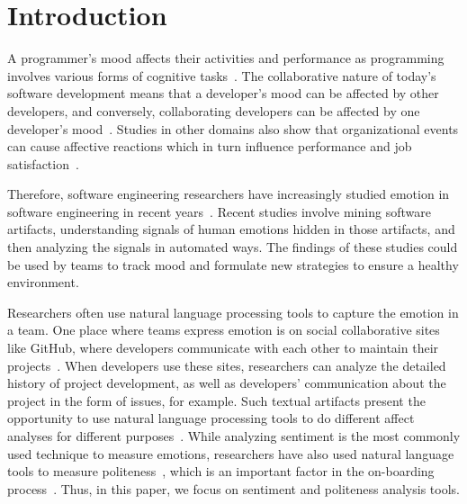 \section{Introduction}

A programmer's mood affects their activities and performance as programming involves various forms of cognitive tasks~\cite{khan2011moods}. 
The collaborative nature of today's software development
means that a developer's mood can be affected by other
developers, and conversely, collaborating developers can be 
affected by one developer's 
mood~\cite{murgia2014developers,graziotin2014happy,curtis1988field}. 
Studies in other domains also show that organizational events can cause affective reactions which in turn influence performance and job satisfaction~\cite{parkinson1996changing}. 

Therefore, software engineering researchers have increasingly studied emotion in software engineering in recent years~\cite{jongeling2017negative}. 
Recent studies involve 
mining software artifacts, 
understanding signals of human emotions hidden in those artifacts, and 
then analyzing the signals in automated ways. 
The findings of these studies could be used by teams to 
track mood and formulate new strategies to ensure 
a healthy environment.


Researchers often use natural language processing tools to capture the emotion in a team.
One place where teams express emotion is on social collaborative sites
like GitHub, where
developers communicate with each other to maintain their projects~\cite{storey2010impact}. 
When developers use these sites, 
researchers can analyze the detailed history of project development, 
as well as developers' communication about the project in the form of issues, for example. 
Such textual artifacts present the opportunity 
to use natural language processing tools 
to do different affect analyses 
for different purposes~\cite{ortu2015bullies,ebert2017confusion,gachechiladze2017anger}. 
While analyzing sentiment is the most commonly used technique to measure emotions, 
researchers have also used natural language tools to measure 
politeness~\cite{ortu2015bullies}, which is an important 
factor in the on-boarding process~\cite{steinmacher2015social}.
Thus, in this paper, we focus on sentiment and 
politeness  analysis tools. 

